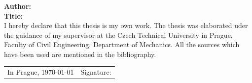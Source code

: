 \documentclass[
11pt, %
english, %
singlespacing, %
headsepline, %
]{MastersDoctoralThesis} %
\begin{document}

\begin{declaration}
\addchaptertocentry{\authorshipname} %
\vspace{1cm}
\noindent
\textbf{Author:} \authornamenodegree
\vspace{5mm} \\
\noindent
\textbf{Title:} \ttitle
\vspace{1.5cm} \\
\noindent
I hereby declare that this thesis is my own work. The thesis was elaborated uder the guidance
of my supervisor \supname at the Czech Technical University in Prague, Faculty
of Civil Engineering, Department of Mechanics.
All the sources which have been used are mentioned in the bibliography.
\vspace{2.9cm} \\
\begin{tabular}{L{200pt} L{100pt}}
In Prague, \today & Signature:
\end{tabular}


 
 
\end{declaration}
\end{document}

